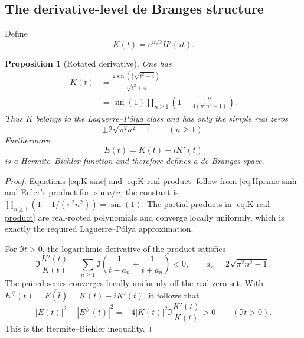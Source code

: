 \documentclass[11pt]{article}
\newtheorem{proposition}[theorem]{Proposition}
\theoremstyle{definition}
\theoremstyle{remark}
\begin{document}
\subsection{The derivative-level de Branges structure}

Define
\begin{equation}\label{eq:K-rotated-derivative}
 K(t)=e^{it/2}H'(it).
\end{equation}

\begin{proposition}[Rotated derivative]
\label{prop:H-rotated-LP}
One has
\begin{align}
 K(t)
 &=\frac{2\sin\!\left(\frac12\sqrt{t^2+4}\right)}{\sqrt{t^2+4}}
 \label{eq:K-sine}\\
 &=\sin(1)\prod_{n\geq1}
   \left(1-\frac{t^2}{4(\pi^2n^2-1)}\right).
 \label{eq:K-real-product}
\end{align}
Thus $K$ belongs to the Laguerre--P\'olya class and has only the simple real
zeros
\[
 \pm2\sqrt{\pi^2n^2-1}\qquad(n\geq1).
\]
Furthermore
\begin{equation}\label{eq:HB-function}
 E(t)=K(t)+iK'(t)
\end{equation}
is a Hermite--Biehler function and therefore defines a de Branges space.
\end{proposition}

\begin{proof}
Equations \eqref{eq:K-sine} and \eqref{eq:K-real-product} follow from
\eqref{eq:Hprime-sinh} and Euler's product for $\sin u/u$; the constant is
$\prod_{n\geq1}(1-1/(\pi^2n^2))=\sin(1)$.  The partial products in
\eqref{eq:K-real-product} are real-rooted polynomials and converge locally
uniformly, which is exactly the required Laguerre--P\'olya approximation.

For $\Im t>0$, the logarithmic derivative of the product satisfies
\[
 \Im\frac{K'(t)}{K(t)}
 =\sum_{n\geq1}\Im\left(
   \frac1{t-a_n}+\frac1{t+a_n}\right)<0,
 \qquad a_n=2\sqrt{\pi^2n^2-1}.
\]
The paired series converges locally uniformly off the real zero set.  With
$E^\#(t)=\overline{E(\bar t)}=K(t)-iK'(t)$, it follows that
\[
 |E(t)|^2-|E^\#(t)|^2
 =-4|K(t)|^2\Im\frac{K'(t)}{K(t)}>0
 \qquad(\Im t>0).
\]
This is the Hermite--Biehler inequality.
\end{proof}
\end{document}
